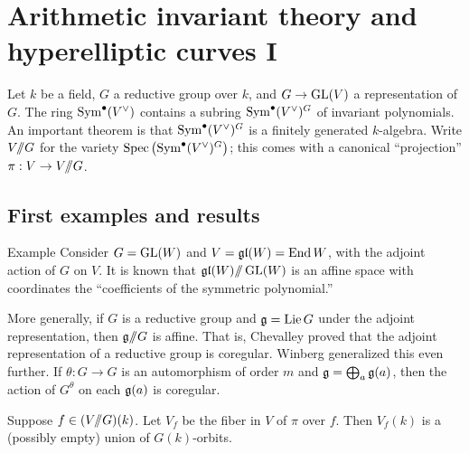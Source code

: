 
\section{Arithmetic invariant theory and hyperelliptic curves I}\label{sec:gross-i}





Let $k$ be a field, $G$ a reductive group over $k$, and 
$G\to \operatorname{GL}(V)$ a representation of $G$. The ring 
$\operatorname{Sym}^\bullet(V^\vee)$ contains a subring 
$\operatorname{Sym}^\bullet(V^\vee)^G$ of invariant polynomials. An important theorem 
is that $\operatorname{Sym}^\bullet(V^\vee)^G$ is a finitely generated $k$-algebra. 
Write $V/\!\!/ G$ for the variety 
$\operatorname{Spec}\left(\operatorname{Sym}^\bullet(V^\vee)^G\right)$; this comes with a 
canonical ``projection'' $\pi:V\to V/\!\!/ G$. 





\subsection{First examples and results}

\begin{enonce}[remark]{Example}
Consider $G=\operatorname{GL}(W)$ and $V=\mathfrak{gl}(W)=\operatorname{End} W$, with the 
adjoint action of $G$ on $V$. It is known that 
$\mathfrak{gl}(W)/\!\!/ \operatorname{GL}(W)$ is an affine space with coordinates the 
``coefficients of the symmetric polynomial.'' 
\end{enonce}

More generally, if $G$ is a reductive group and $\mathfrak{g}=\operatorname{Lie} G$ under the 
adjoint representation, then $\mathfrak{g}/\!\!/ G$ is affine. That is, Chevalley 
proved that the adjoint representation of a reductive group is coregular. 
Winberg generalized this even further. If $\theta:G\to G$ is an 
automorphism of order $m$ and $\mathfrak{g}=\bigoplus_a \mathfrak{g}(a)$, then 
the action of $G^\theta$ on each $\mathfrak{g}(a)$ is coregular. 

Suppose $f\in (V/\!\!/ G)(k)$. Let $V_f$ be the fiber in $V$ of $\pi$ over $f$. 
Then $V_f(k)$ is a (possibly empty) union of $G(k)$-orbits. 

